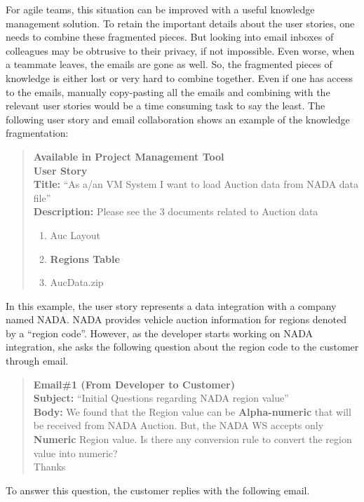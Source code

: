 For agile teams, this situation can be improved with a useful knowledge management solution. To retain the important details about the user stories, one needs to combine these fragmented pieces. But looking into email inboxes of colleagues may be obtrusive to their privacy, if not impossible. Even worse, when a teammate leaves, the emails are gone as well. So, the fragmented pieces of knowledge is either lost or very hard to combine together. Even if one has access to the emails, manually copy-pasting all the emails and combining with the relevant user stories would be a time consuming task to say the least. The following user story and email collaboration shows an example of the knowledge fragmentation:

\begin{quote}
	\textbf{Available in Project Management Tool}\\
	\textbf{User Story}\\
	\textbf{Title:} ``As a/an VM System I want to load Auction data from NADA data file''\\
	\textbf{Description:} Please see the 3 documents related to Auction data
	\begin{enumerate}
		\item Auc Layout
		\item \textbf{Regions Table}
		\item AucData.zip
	\end{enumerate}
\end{quote}

In this example, the user story represents a data integration with a company named NADA. NADA provides vehicle auction information for regions denoted by a ``region code''. However, as the developer starts working on NADA integration, she asks the following question about the region code to the customer through email. 

\begin{quote}
\textbf{Email\#1 (From Developer to Customer)}\\
\textbf{Subject:} ``Initial Questions regarding NADA region value''\\
\textbf{Body:} We found that the Region value can be \textbf{Alpha-numeric} that will be received from NADA Auction. But, the NADA WS accepts only \textbf{Numeric} Region value. Is there any conversion rule to convert the region value into numeric? \\
Thanks
\end{quote}

To answer this question, the customer replies with the following email.

